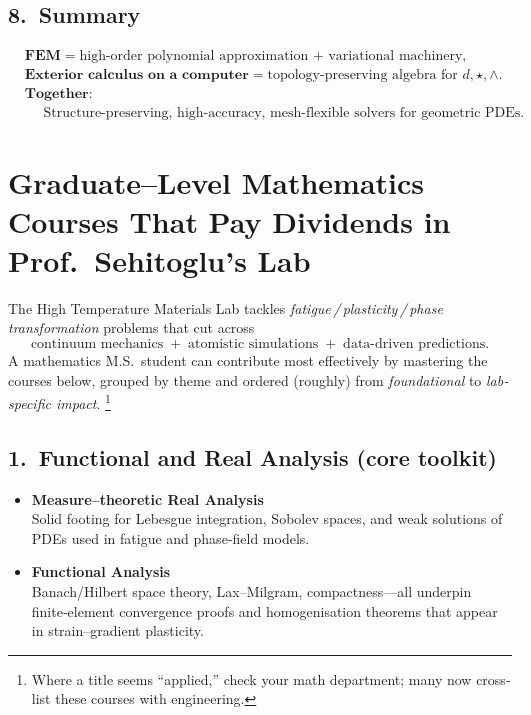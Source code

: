 \documentclass[12pt]{article}
\theoremstyle{definition} %
\theoremstyle{plain} %
\begin{document}
\subsection*{8.\  Summary}
\begin{align}
  &\textbf{FEM} = \text{high-order polynomial approximation +
                    variational machinery},\\
  &\textbf{Exterior calculus on a computer} = \text{topology‑preserving
     algebra for }d,\star,\wedge.\\[4pt]
  &\textbf{Together:}\\
  &\phantom{=}\;\;
     \boxed{\text{Structure‑preserving, high‑accuracy,
              mesh‑flexible solvers for geometric PDEs.}}
\end{align}
\section*{Graduate–Level Mathematics Courses That Pay Dividends in Prof.\ Sehitoglu’s Lab}

\noindent
The High Temperature Materials Lab tackles \emph{fatigue\,/\,plasticity\,/\,phase transformation} problems that cut across
\[
  \text{continuum mechanics} \;+\;
  \text{atomistic simulations} \;+\;
  \text{data‐driven predictions}.
\]
A mathematics M.S.\ student can contribute most effectively by mastering the
courses below, grouped by theme and ordered (roughly) from \emph{foundational}
to \emph{lab‐specific impact}.%
\footnote{Where a title seems “applied,” check your math department;
many now cross‐list these courses with engineering.}

\subsection*{1.\  Functional and Real Analysis (core toolkit)}
\begin{itemize}
  \item \textbf{Measure–theoretic Real Analysis}
        \\Solid footing for Lebesgue integration, Sobolev spaces, and weak
        solutions of PDEs used in fatigue and phase‐field models.
  \item \textbf{Functional Analysis}
        \\Banach/Hilbert space theory, Lax–Milgram, compactness—all
        underpin finite‑element convergence proofs and homogenisation
        theorems that appear in strain–gradient plasticity.
\end{itemize}
\end{document}

